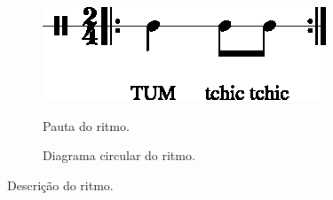 \begin{figure}[H]
\centering
     \begin{subfigure}[c]{0.45\textwidth}
         \centering
         \href{https://drive.google.com/file/d/1Rv5mxppwuJ288xe-EBXf1-5v_tWCvhgc/view?usp=sharing}{\includegraphics[width=\textwidth]{chapters/cap-musicalidade-percepcion/treino-ritmo2-1.eps}}
         \caption{Pauta do ritmo.}
         \label{fig:RitmoTUMtchictchic1}
     \end{subfigure}
     \hfill
     \begin{subfigure}[c]{0.45\textwidth}
         \centering
{}
         \caption{Diagrama circular do ritmo.}
         \label{fig:RitmoTUMtchictchic2}
     \end{subfigure}
\caption{Descrição do ritmo.}
\label{fig:abc-percepcionritmica2}
\end{figure}


